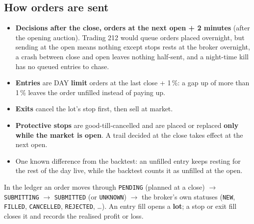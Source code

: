 \documentclass[11pt,a4paper]{article}
\newcommand\code[1]{\texttt{#1}}
\begin{document}
\subsection{How orders are sent}
\begin{itemize}
  \item \textbf{Decisions after the close, orders at the next open + 2 minutes} (after the opening auction). Trading 212
        would queue orders placed overnight, but sending at the open means nothing except stops rests at the broker overnight,
        a crash between close and open leaves nothing half-sent, and a night-time kill has no queued entries to chase.
  \item \textbf{Entries} are DAY \textbf{limit} orders at the last close + 1\,\%: a gap up of more than 1\,\% leaves the order
        unfilled instead of paying up.
  \item \textbf{Exits} cancel the lot's stop first, then sell at market.
  \item \textbf{Protective stops} are good-till-cancelled and are placed or replaced \textbf{only while the market is open}.
        A trail decided at the close takes effect at the next open.
  \item One known difference from the backtest: an unfilled entry keeps resting for the rest of the day live, while the
        backtest counts it as unfilled at the open.
\end{itemize}
In the ledger an order moves through \code{PENDING} (planned at a close) $\to$ \code{SUBMITTING} $\to$ \code{SUBMITTED} (or
\code{UNKNOWN}) $\to$ the broker's own statuses (\code{NEW}, \code{FILLED}, \code{CANCELLED}, \code{REJECTED}, \dots). An entry fill
opens a \textbf{lot}; a stop or exit fill closes it and records the realised profit or loss.
\end{document}
